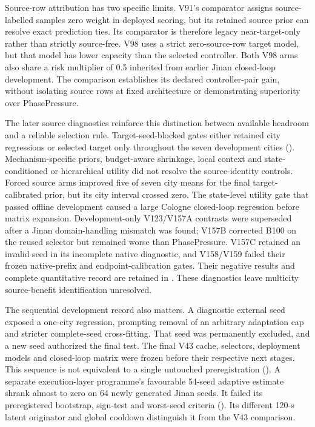Source-row attribution has two specific limits.  V91's comparator assigns source-labelled
samples zero weight in deployed scoring, but its retained source prior can
resolve exact prediction ties.  Its comparator is therefore legacy
near-target-only rather than strictly source-free.  V98 uses a strict
zero-source-row target model, but that model has lower capacity than the
selected controller.  Both V98 arms also share a risk multiplier of 0.5
inherited from earlier Jinan closed-loop development.  The comparison
establishes its declared controller-pair gain, without isolating source rows
at fixed architecture or demonstrating superiority over PhasePressure.

The later source diagnostics reinforce this distinction between available
headroom and a reliable selection rule.  Target-seed-blocked gates either
retained city regressions or selected target only throughout the seven
development cities ().
Mechanism-specific priors, budget-aware shrinkage, local context and
state-conditioned or hierarchical utility did not resolve the source-identity
controls.  Forced source arms improved five of seven city means for the final
target-calibrated prior, but its city interval crossed zero.  The state-level
utility gate that passed offline development caused a large Cologne
closed-loop regression before matrix expansion.
Development-only V123/V157A contrasts were superseded after a Jinan
domain-handling mismatch was found; V157B corrected B100 on the reused
selector but remained worse than PhasePressure.  V157C retained an invalid
seed in its incomplete native diagnostic, and V158/V159 failed their frozen
native-prefix and endpoint-calibration gates.  Their negative results and
complete quantitative record are retained in
.
These diagnostics leave multicity source-benefit identification unresolved.

The sequential development record also matters.  A diagnostic external seed
exposed a one-city regression, prompting removal of an arbitrary adaptation
cap and stricter complete-seed cross-fitting.  That seed was permanently
excluded, and a new seed authorized the final test.  The final V43 cache,
selectors, deployment models and closed-loop matrix were frozen before their
respective next stages.  This sequence is not equivalent to a single
untouched preregistration ().
A separate execution-layer programme's favourable 54-seed adaptive estimate
shrank almost to zero on 64 newly generated Jinan seeds.
It failed its preregistered bootstrap, sign-test and worst-seed criteria
().
Its different 120-s latent originator and global cooldown distinguish it
from the V43 comparison.

